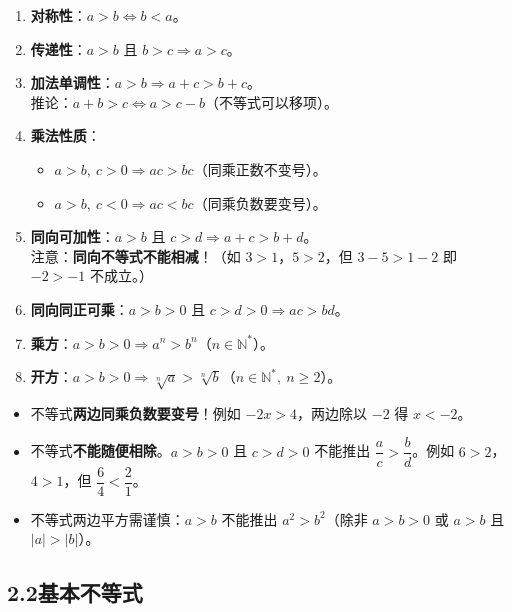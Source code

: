 \documentclass[12pt, a4paper]{ctexart}
\begin{document}
\begin{knowledgebox}[不等式的基本性质]
\begin{enumerate}[leftmargin=2em]
  \item \textbf{对称性}：$a > b \Leftrightarrow b < a$。
  \item \textbf{传递性}：$a > b$ 且 $b > c \Rightarrow a > c$。
  \item \textbf{加法单调性}：$a > b \Rightarrow a + c > b + c$。\\
    推论：$a + b > c \Leftrightarrow a > c - b$（不等式可以移项）。
  \item \textbf{乘法性质}：
    \begin{itemize}
      \item $a > b,\ c > 0 \Rightarrow ac > bc$（同乘正数不变号）。
      \item $a > b,\ c < 0 \Rightarrow ac < bc$（同乘负数要变号）。
    \end{itemize}
  \item \textbf{同向可加性}：$a > b$ 且 $c > d \Rightarrow a + c > b + d$。\\
    注意：\textbf{同向不等式不能相减}！（如 $3 > 1$，$5 > 2$，但 $3 - 5 > 1 - 2$ 即 $-2 > -1$ 不成立。）
  \item \textbf{同向同正可乘}：$a > b > 0$ 且 $c > d > 0 \Rightarrow ac > bd$。
  \item \textbf{乘方}：$a > b > 0 \Rightarrow a^n > b^n$（$n \in \mathbb{N}^*$）。
  \item \textbf{开方}：$a > b > 0 \Rightarrow \sqrt[n]{a} > \sqrt[n]{b}$（$n \in \mathbb{N}^*,\ n \geq 2$）。
\end{enumerate}
\end{knowledgebox}

\begin{warnbox}
\begin{itemize}[leftmargin=2em]
  \item 不等式\textbf{两边同乘负数要变号}！例如 $-2x > 4$，两边除以 $-2$ 得 $x < -2$。
  \item 不等式\textbf{不能随便相除}。$a > b > 0$ 且 $c > d > 0$ 不能推出 $\dfrac{a}{c} > \dfrac{b}{d}$。例如 $6 > 2$，$4 > 1$，但 $\dfrac{6}{4} < \dfrac{2}{1}$。
  \item 不等式两边平方需谨慎：$a > b$ 不能推出 $a^2 > b^2$（除非 $a > b > 0$ 或 $a > b$ 且 $|a| > |b|$）。
\end{itemize}
\end{warnbox}

\subsection*{2.2\quad 基本不等式}
\end{document}
